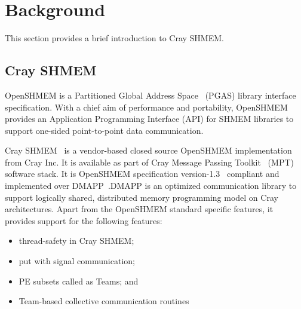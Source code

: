 \section{Background}
\label{src:bground}

This section provides a brief introduction to Cray SHMEM.%

\subsection{Cray SHMEM}
\label{src:bg/crayshmem}
OpenSHMEM is a Partitioned Global Address Space~\cite{pgas} (PGAS) library
interface specification.%
With a chief aim of performance and portability, OpenSHMEM
provides an Application Programming Interface (API) for SHMEM libraries
to support one-sided point-to-point data communication.

Cray SHMEM~\cite{csma} is a vendor-based
closed source OpenSHMEM implementation from Cray Inc.
It is available as part of
Cray Message Passing Toolkit~\cite{mpt} (MPT) software stack. It is
OpenSHMEM
specification version-1.3~\cite{osm13} compliant and implemented over
DMAPP~\cite{dmapp}.DMAPP is an
optimized communication library to support logically shared, distributed
memory programming model on Cray architectures. Apart from the
OpenSHMEM standard
specific features, it provides support for the following features:%
\begin{itemize}
    \item thread-safety in Cray SHMEM;
    \item put with signal communication;
    \item PE subsets called as Teams; and
    \item Team-based collective communication routines
\end{itemize}

